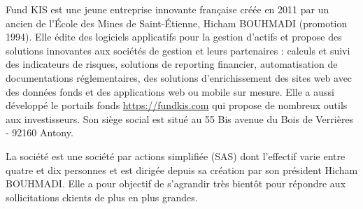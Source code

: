 Fund KIS est une jeune entreprise innovante française créée en 2011 par un ancien de l'\'Ecole des Mines de Saint-\'Etienne, Hicham BOUHMADI (promotion 1994). Elle édite des logiciels applicatifs pour la gestion d'actifs et propose des solutions innovantes aux sociétés de gestion et leurs partenaires : calculs et suivi des indicateurs de risques, solutions de reporting financier, automatisation de documentations réglementaires, des solutions d'enrichissement des sites web avec des données fonds et des applications web ou mobile sur mesure. Elle a aussi développé le portails fonds \url{https://fundkis.com} qui propose de nombreux outils aux investisseurs. Son siège social est situé au 55 Bis avenue du Bois de Verrières - 92160 Antony.

\vspace{3mm}

La société est une société par actions simplifiée (SAS) dont l'effectif varie entre quatre et dix personnes et est dirigée depuis sa création par son président Hicham BOUHMADI. Elle a pour objectif de s'agrandir très bientôt pour répondre aux sollicitations ckients de plus en plus grandes.

